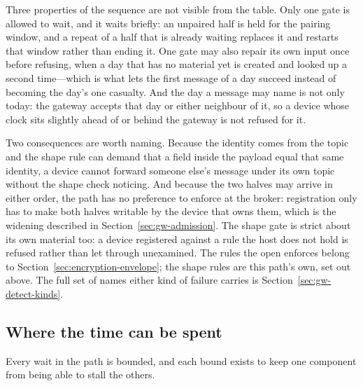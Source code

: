 \documentclass[12pt,a4paper]{report}
\begin{document}
Three properties of the sequence are not visible from the table. Only
one gate is allowed to wait, and it waits briefly: an unpaired half is
held for the pairing window, and a repeat of a half that is already
waiting replaces it and restarts that window rather than ending it. One
gate may also repair its own input once before refusing, when a day
that has no material yet is created and looked up a second time---which
is what lets the first message of a day succeed instead of becoming the
day's one casualty. And the day a message may name is not only today:
the gateway accepts that day or either neighbour of it, so a device
whose clock sits slightly ahead of or behind the gateway is not refused
for it.

Two consequences are worth naming. Because the identity comes from the
topic and the shape rule can demand that a field inside the payload
equal that same identity, a device cannot forward someone else's
message under its own topic without the shape check noticing. And
because the two halves may arrive in either order, the path has no
preference to enforce at the broker: registration only has to make both
halves writable by the device that owns them, which is the widening
described in Section~\ref{sec:gw-admission}. The shape gate is strict
about its own material too: a device registered against a rule the host
does not hold is refused rather than let through unexamined. The rules the
open enforces belong to Section~\ref{sec:encryption-envelope}; the shape
rules are this path's own, set out above. The full set of names either kind
of failure carries is Section~\ref{sec:gw-detect-kinds}.

\subsection{Where the time can be spent}
\label{sec:gw-in-timing}

Every wait in the path is bounded, and each bound exists to keep one
component from being able to stall the others.
\end{document}
